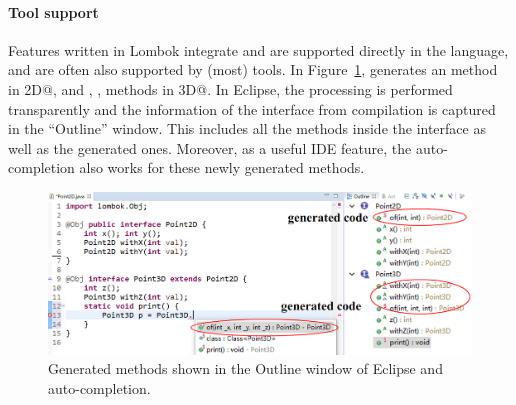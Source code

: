 \paragraph{Tool support}
Features written in Lombok integrate and are supported directly in the
language, and are often also supported by (most) tools.  
In Figure~\ref{fig:screenshot},
\mixin generates an \Q@of@ method in \Q@Point2D@, and \Q@of@, \Q@withX@, \Q@withY@ methods in \Q@Point3D@.
In Eclipse, the processing is
performed transparently and the information of the interface from
compilation is captured in the ``Outline'' window.
This includes all
the methods inside the interface as well as the generated ones.
Moreover, as a useful IDE feature, the auto-completion also works for these newly generated methods.

\begin{figure}[t]
\saveSpaceFig
\saveSpaceFig
\centering
\includegraphics[width=4.5in]{pdfs/screenshot4.png}
\caption{Generated methods shown in the Outline window of Eclipse and auto-completion.}
\label{fig:screenshot}
\saveSpaceFig
\end{figure}


